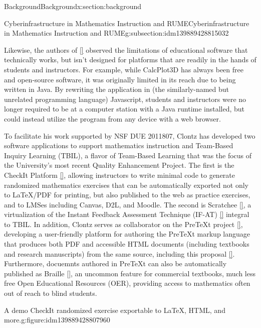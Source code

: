 \documentclass[oneside,10pt,]{article}
\newcommand{\xreffont}{\relax}
\begin{document}
\begin{sectionptx}{Background}{}{Background}{}{}{x:section:background}
\begin{subsectionptx}{Cyberinfrastructure in Mathematics Instruction and RUME}{}{Cyberinfrastructure in Mathematics Instruction and RUME}{}{}{g:subsection:idm139889428815032}
\par
Likewise, the authors of \hyperlink{x:biblio:biblio-calcplot3d}{[{\xreffont 26}]} observed the limitations of educational software that technically works, but isn't designed for platforms that are readily in the hands of students and instructors. For example, while CalcPlot3D has always been free and open-source software, it was originally limited in its reach due to being written in Java. By rewriting the application in (the similarly-named but unrelated programming language) Javascript, students and instructors were no longer required to be at a computer station with a Java runtime installed, but could instead utilize the program from any device with a web browser.%
\par
To facilitate his work supported by NSF DUE 2011807, Clontz has developed two software applications to support mathematics instruction and Team-Based Inquiry Learning (TBIL), a flavor of Team-Based Learning that was the focus of the University's most recent Quality Enhancement Project. The first is the CheckIt Platform \hyperlink{x:biblio:biblio-checkit}{[{\xreffont 7}]}, allowing instructors to write minimal code to generate randomized mathematics exercises that can be automatically exported not only to LaTeX\slash{}PDF for printing, but also published to the web as practice exercises, and to LMSes including Canvas, D2L, and Moodle. The second is Scratchee \hyperlink{x:biblio:biblio-scratchee}{[{\xreffont 10}]}, a virtualization of the Instant Feedback Assessment Technique (IF-AT) \hyperlink{x:biblio:biblio-ifat}{[{\xreffont 12}]} integral to TBIL. In addition, Clontz serves as collaborator on the PreTeXt project \hyperlink{x:biblio:biblio-pretext}{[{\xreffont 5}]}, developing a user-friendly platform for authoring the PreTeXt markup language that produces both PDF and accessible HTML documents (including textbooks and research manuscripts) from the same source, including this proposal \hyperlink{x:biblio:biblio-repo}{[{\xreffont 11}]}. Furthermore, docuemnts authored in PreTeXt can also be automatically published as Braille \hyperlink{x:biblio:biblio-braille}{[{\xreffont 2}]}, an uncommon feature for commercial textbooks, much less free Open Educational Resources (OER), providing access to mathematics often out of reach to blind students.%
\begin{figureptx}{A demo CheckIt randomized exercise exportable to LaTeX, HTML, and more.}{g:figure:idm139889428807960}{}%
\begin{image}{0}{1}{0}%

\end{image}
\end{figureptx}
\end{subsectionptx}
\end{sectionptx}
\end{document}
